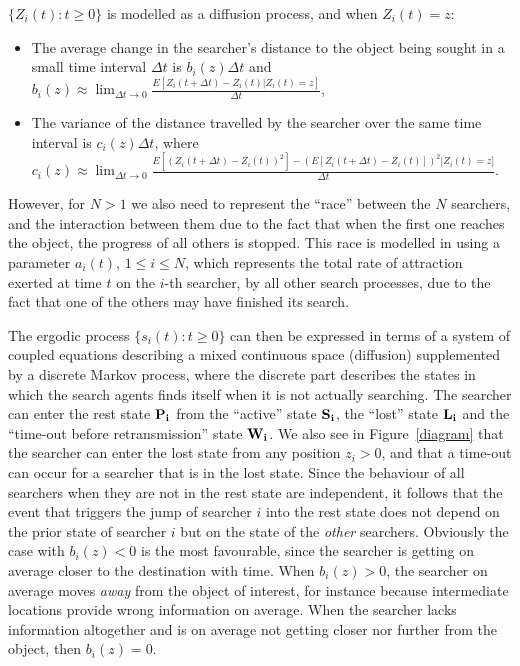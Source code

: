 \documentclass[journal]{IEEEtran}
\begin{document}
$\{Z_i(t):t\geq 0\}$ is modelled as a diffusion process, and when $Z_i(t)=z$:
\begin{itemize}
\item The average change in the searcher's distance to the object being sought in a small time interval $\Delta t$ is $b_i(z) \Delta t$ and $b_i(z)\approx \lim_{\Delta t\rightarrow 0}\frac{E[Z_i(t+\Delta t)-Z_i(t) |Z_i(t)=z]}{\Delta t}$,
\item The variance of the distance travelled by the searcher over the same time interval is $c_i(z) \Delta t$, where $c_i(z)\approx \lim_{\Delta t\rightarrow 0}\frac{E[(Z_i(t+\Delta t)-Z_i(t))^2]-(E[Z_i(t+\Delta t)-Z_i(t)])^2| Z_i(t)=z]}{\Delta t}$.
\end{itemize}
However, for $N>1$ we also need to represent the ``race'' between the $N$ searchers, and the interaction between them due to the fact that when the first one reaches the object, the progress of all others is stopped. This race is modelled in \cite{Gelenbe2010} using a parameter $a_i(t)$, $1\leq i\leq N$, which represents the total rate of attraction exerted at time $t$ on the $i$-th searcher, by all other search processes, due to the fact that one of the others may have finished its search.

The ergodic process $\{s_i(t): t\geq 0\}$ can then be expressed in terms of a system of coupled equations describing a mixed continuous space (diffusion) supplemented by a discrete Markov process, where the discrete part describes the states in which the search agents finds itself when it is not actually searching. The searcher can enter the rest state $\bf P_i$ from the ``active'' state $\bf S_i$, the ``lost'' state $\bf L_i$ and the ``time-out before retransmission'' state $\bf W_i$. We also see in Figure~\ref{diagram} that the searcher can enter the lost state from any position $z_i>0$, and that a time-out can occur for a searcher that is in the lost state. Since the behaviour of all searchers when they are not in the rest state are independent, it follows that the event that triggers the jump of searcher $i$ into the rest state does not depend on the prior state of searcher $i$ but on the state of the {\em other} searchers.
Obviously the case with $b_i(z)<0$ is the most favourable, since the searcher is getting on average closer to the destination with time. When  $b_i(z)>0$,  the searcher on average moves {\em away} from the object of interest, for instance because intermediate locations provide wrong information on average. When the searcher lacks information altogether
and is on average not getting closer nor further from the object, then $b_i(z)=0$.
\end{document}
